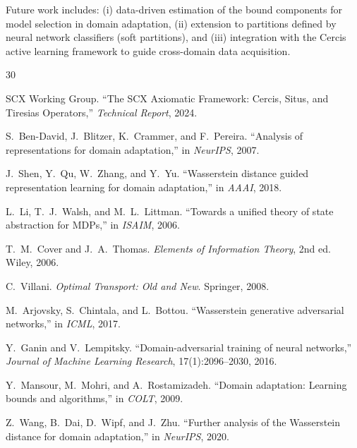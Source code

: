 \documentclass[12pt,a4paper]{article}
\begin{document}
\medskip\noindent
Future work includes: (i) data-driven estimation of the bound components
for model selection in domain adaptation, (ii) extension to partitions
defined by neural network classifiers (soft partitions), and (iii)
integration with the Cercis active learning framework to guide
cross-domain data acquisition.


\begin{thebibliography}{30}

SCX Working Group.
\newblock ``The SCX Axiomatic Framework: Cercis, Situs, and Tiresias
Operators,''
\newblock \emph{Technical Report}, 2024.

S.~Ben-David, J.~Blitzer, K.~Crammer, and F.~Pereira.
\newblock ``Analysis of representations for domain adaptation,''
\newblock in \emph{NeurIPS}, 2007.

J.~Shen, Y.~Qu, W.~Zhang, and Y.~Yu.
\newblock ``Wasserstein distance guided representation learning for domain
adaptation,''
\newblock in \emph{AAAI}, 2018.

L.~Li, T.~J.~Walsh, and M.~L.~Littman.
\newblock ``Towards a unified theory of state abstraction for MDPs,''
\newblock in \emph{ISAIM}, 2006.

T.~M.~Cover and J.~A.~Thomas.
\newblock \emph{Elements of Information Theory}, 2nd ed.
\newblock Wiley, 2006.

C.~Villani.
\newblock \emph{Optimal Transport: Old and New}.
\newblock Springer, 2008.

M.~Arjovsky, S.~Chintala, and L.~Bottou.
\newblock ``Wasserstein generative adversarial networks,''
\newblock in \emph{ICML}, 2017.

Y.~Ganin and V.~Lempitsky.
\newblock ``Domain-adversarial training of neural networks,''
\newblock \emph{Journal of Machine Learning Research}, 17(1):2096--2030,
2016.

Y.~Mansour, M.~Mohri, and A.~Rostamizadeh.
\newblock ``Domain adaptation: Learning bounds and algorithms,''
\newblock in \emph{COLT}, 2009.

Z.~Wang, B.~Dai, D.~Wipf, and J.~Zhu.
\newblock ``Further analysis of the Wasserstein distance for domain
adaptation,''
\newblock in \emph{NeurIPS}, 2020.


\end{thebibliography}
\end{document}
